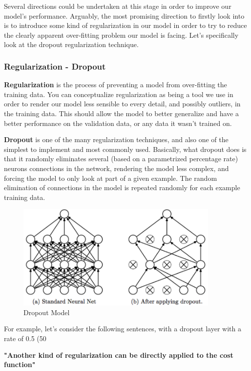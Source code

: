 \documentclass{article}
\begin{document}
Several directions could be undertaken at this stage in order to improve our model's performance. Arguably, the most promising direction to firstly look into is to introduce some kind of regularization in our model in order to try to reduce the clearly apparent over-fitting problem our model is facing. Let's specifically look at the dropout regularization technique.

\subsubsection{Regularization - Dropout}

\textbf{Regularization} is the process of preventing a model from over-fitting the training data. You can conceptualize regularization as being a tool we use in order to render our model less sensible to every detail, and possibly outliers, in the training data. This should allow the model to better generalize and have a better performance on the validation data, or any data it wasn't trained on.

\textbf{Dropout} is one of the many regularization techniques, and also one of the simplest to implement and most commonly used. Basically, what dropout does is that it randomly eliminates several (based on a parametrized percentage rate) neurons connections in the network, rendering the model less complex, and forcing the model to only look at part of a given example. The random elimination of connections in the model is repeated randomly for each example training data.

\begin{figure}[h!]
    \centering
    \includegraphics[width=10cm]{dropout.png}
    \caption{Dropout Model}
    \label{fig:my_label}
\end{figure}

For example, let's consider the following sentences, with a dropout layer with a rate of 0.5 (50%

\textbf{"Another kind of regularization can be directly applied to the cost function"}
\end{document}
